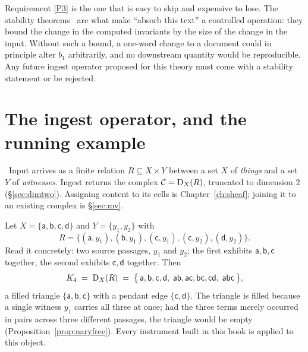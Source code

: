 \begin{hon}\Hon
Requirement \ref{P3} is the one that is easy to skip and expensive to lose.
The stability theorems~\cite{CEH,ChazalStructure} are what make ``absorb this
text'' a controlled operation: they bound the change in the computed
invariants by the size of the change in the input. Without such a bound, a
one-word change to a document could in principle alter $b_1$ arbitrarily, and
no downstream quantity would be reproducible. Any future ingest operator
proposed for this theory must come with a stability statement or be rejected.
\end{hon}

\section{The ingest operator, and the running example}

\begin{construction}[Ingest]\label{con:ingest}
\Proposed\ Input arrives as a finite relation $R\subseteq X\times Y$ between
a set $X$ of \emph{things} and a set $Y$ of \emph{witnesses}. Ingest returns
the complex $\mathcal{C}=\mathrm{D}_{X}(R)$, truncated to dimension $2$
(\S\ref{sec:dimtwo}). Assigning content to its cells is
Chapter~\ref{ch:sheaf}; joining it to an existing complex is
\S\ref{sec:mv}.
\end{construction}

\begin{example}\label{ex:K4}
Let $X=\{\mathsf a,\mathsf b,\mathsf c,\mathsf d\}$ and $Y=\{y_1,y_2\}$ with
\[
  R=\bigl\{(\mathsf a,y_1),(\mathsf b,y_1),(\mathsf c,y_1),
           (\mathsf c,y_2),(\mathsf d,y_2)\bigr\}.
\]
Read it concretely: two source passages, $y_1$ and $y_2$; the first exhibits
$\mathsf a,\mathsf b,\mathsf c$ together, the second exhibits
$\mathsf c,\mathsf d$ together. Then
\[
  K_4 \;=\; \mathrm{D}_{X}(R) \;=\;
  \bigl\{\,\mathsf a,\mathsf b,\mathsf c,\mathsf d,\;
    \mathsf{ab},\mathsf{ac},\mathsf{bc},\mathsf{cd},\;
    \mathsf{abc}\,\bigr\},
\]
a filled triangle $\{\mathsf a,\mathsf b,\mathsf c\}$ with a pendant edge
$\{\mathsf c,\mathsf d\}$. The triangle is filled because a single witness
$y_1$ carries all three at once; had the three terms merely occurred in
pairs across three different passages, the triangle would be empty
(Proposition~\ref{prop:naryfree}). Every instrument built in this book is
applied to this object.
\end{example}

